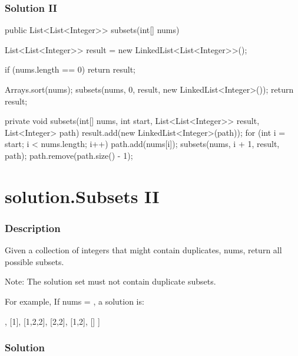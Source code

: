 \newpage

\subsubsection{Solution II}

\begin{Code}
public List<List<Integer>> subsets(int[] nums) {
    List<List<Integer>> result = new LinkedList<List<Integer>>();

    if (nums.length == 0) {
        return result;
    }

    Arrays.sort(nums);
    subsets(nums, 0, result, new LinkedList<Integer>());
    return result;
}

private void subsets(int[] nums, int start, List<List<Integer>> result, List<Integer> path) {
    result.add(new LinkedList<Integer>(path));
    for (int i = start; i < nums.length; i++) {
        path.add(nums[i]);
        subsets(nums, i + 1, result, path);
        path.remove(path.size() - 1);
    }
}
\end{Code}

\newpage

\section{solution.Subsets II} %

\subsubsection{Description}
Given a collection of integers that might contain duplicates, nums, return all possible subsets.

Note: The solution set must not contain duplicate subsets.

For example,
If nums = \code{[1,2,2]}, a solution is:

\begin{Code}
[
  [2],
  [1],
  [1,2,2],
  [2,2],
  [1,2],
  []
]
\end{Code}

\subsubsection{Solution}

